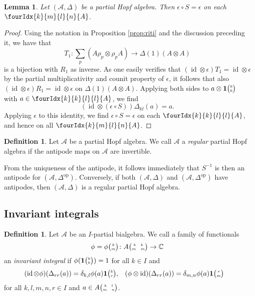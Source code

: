\documentclass[10pt]{article}
\DeclareMathOperator{\id}{id}
\DeclareMathOperator{\op}{\mathrm{op}}
\newcommand{\C}{\mathbb{C}}
\newcommand{\Grt}[3]{#1{\tiny {\begin{pmatrix} #2\\#3\end{pmatrix}}}}
\newcommand{\UnitC}[2]{\Grt{\mathbf{1}}{#1}{#2}}
\newcommand{\pmat}[4]{{\tiny \begin{pmatrix} #1 \quad #2 \\ #3 \quad #4\end{pmatrix}}}
\newcommand{\Gr}[5]{\fourIdx{#2}{#4}{#3}{#5}{#1}}%
\newtheorem{Lem}[Theorem]{Lemma}
\theoremstyle{definition}
\newtheorem{Def}[Theorem]{Definition}
\newcommand{\phic}[2]{\Grt{\phi}{#1}{#2}}
\numberwithin{equation}{section}
\begin{document}

\begin{Lem}\label{LemCoAnt} Let $(\mathscr{A},\Delta)$ be a partial Hopf algebra. Then $\epsilon\circ S = \epsilon$ on each $\Gr{A}{k}{l}{m}{n}$.
\end{Lem}

\begin{proof} Using the notation in Proposition \ref{prop:riti} and the discussion preceding it, we have that \[T_1: \sum_p(A\rho_p\otimes \rho_p A)\rightarrow \Delta(1)(A\otimes A)\] is a bijection with $R_1$ as inverse. As one easily verifies that $(\id\otimes \epsilon)T_1 = \id\otimes \epsilon$ by the partial multiplicativity and counit property of $\epsilon$, it follows that also $(\id\otimes \epsilon)R_1 = \id\otimes \epsilon$ on $\Delta(1)(A\otimes A)$. Applying both sides to $a\otimes \UnitC{k}{k}$ with $a\in \Gr{A}{k}{l}{k}{l}$, we find \[(\id\otimes (\epsilon\circ S))\Delta_{kl}(a) = a.\] Applying $\epsilon$ to this identity, we find $\epsilon\circ S = \epsilon$ on each $\Gr{A}{k}{l}{k}{l}$, and hence on all $\Gr{A}{k}{l}{m}{n}$.
\end{proof} 


\begin{Def} Let $\mathscr{A}$ be a partial Hopf algebra. We call $\mathscr{A}$ a \emph{regular} partial Hopf algebra if the antipode maps on $\mathscr{A}$ are invertible.
\end{Def}

From the uniqueness of the antipode, it follows immediately that $S^{-1}$ is then an antipode for $(\mathscr{A},\Delta^{\op})$. Conversely, if both $(\mathscr{A},\Delta)$ and $(\mathscr{A},\Delta^{\op})$ have antipodes, then $(\mathscr{A},\Delta)$ is a regular partial Hopf algebra. 

\subsection{Invariant integrals}


\begin{Def}
  Let $\mathscr{A}$ be an $I$-partial bialgebra.  We call a family of
  functionals
\begin{align} \label{eq:functionals}
  \phi = \phic{k}{m} \colon A\pmat{k}{k}{m}{m} \to \C
\end{align}
an \emph{invariant} \emph{integral} if
 $\phi(\UnitC{k}{k})=1$ for all $k\in
I$ and
\begin{align}
  \label{eq:integral}
   (\id \otimes \phi)(\Delta_{rr}(a)) 
&= \delta_{k,l} \phi(a)
  \UnitC{k}{r}, &   (\phi \otimes
  \id)(\Delta_{rr}(a))&= \delta_{m,n} \phi(a) \UnitC{r}{m}
\end{align}
 for all $k,l,m,n,r\in I$ and $a \in A\pmat{k}{l}{m}{n}$. 
\end{Def}
\end{document}
